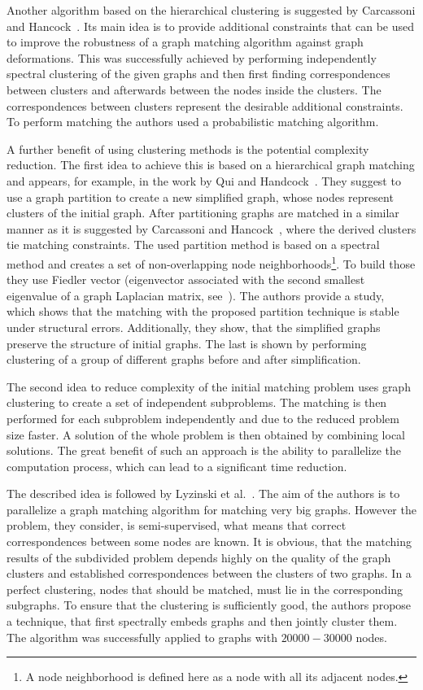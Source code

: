 Another algorithm based on the hierarchical clustering is suggested by Carcassoni and Hancock~\cite{Hancock_ModalClusters}. Its main idea is to provide additional constraints that can be used to improve the robustness of a graph matching algorithm against graph deformations. This was successfully achieved by performing independently spectral clustering of the given graphs and then first finding correspondences between clusters and afterwards between the nodes inside the clusters. The correspondences between clusters represent the desirable additional constraints. To perform matching the authors used a probabilistic matching algorithm.

A further benefit of using clustering methods is the potential complexity reduction. 
The first idea to achieve this is based on a hierarchical graph matching and appears, for example, in the work by Qui and Handcock~\cite{Hancock_GM_SpectralPart}. They suggest to use a graph partition to create a new simplified graph, whose nodes represent clusters of the initial graph. After partitioning graphs are matched in a similar manner as it is suggested by Carcassoni and Hancock~\cite{Hancock_ModalClusters}, where the derived clusters tie matching constraints. The used partition method is based on a spectral method and creates a set of non-overlapping node neighborhoods\footnote{A node neighborhood is defined here as a node with all its adjacent nodes.}. To build those they use Fiedler vector (eigenvector associated with the second smallest eigenvalue of a graph Laplacian matrix, see~\cite{Fiedler1975}). The authors provide a study, which shows that the matching with the proposed partition technique is stable under structural errors. Additionally, they show, that the simplified graphs preserve the structure of initial graphs. The last is shown by performing clustering of a group of different graphs before and after simplification.

The second idea to reduce complexity of the initial matching problem uses graph clustering to create a set of independent subproblems. The matching is then performed for each subproblem independently and due to the reduced problem size faster. A solution of the whole problem is then obtained by combining local solutions. The great benefit of such an approach is the ability to parallelize the computation process, which can lead to a significant time reduction.

The described idea is followed by Lyzinski et al.~\cite{Lyzinski2015}. The aim of the authors is to parallelize a graph matching algorithm for matching very big graphs. However the problem, they consider, is semi-supervised, what means that correct correspondences between some nodes are known. It is obvious, that the matching results of the subdivided problem depends highly on the quality of the graph clusters and established correspondences between the clusters of two graphs. In a perfect clustering, nodes that should be matched, must lie in the corresponding subgraphs. To ensure that the clustering is sufficiently good, the authors propose a technique, that first spectrally embeds graphs and then jointly cluster them. The algorithm was successfully applied to graphs with $20000-30000$ nodes.

